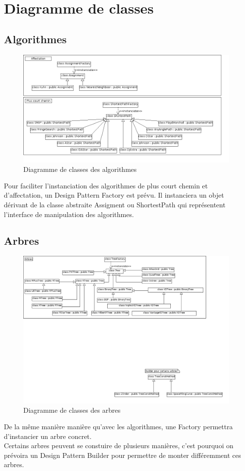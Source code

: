 \section{Diagramme de classes}
\subsection{Algorithmes}
\begin{figure}[!h]\centering
   \includegraphics[scale=0.5]{images/c_algo.png}
   \caption{\label{c_algo} Diagramme de classes des algorithmes}
\end{figure}
Pour faciliter l'instanciation des algorithmes de plus court chemin et d'affectation, un Design Pattern Factory est prévu. Il instanciera un objet dérivant de la classe abstraite Assigment ou ShortestPath qui représentent l'interface de manipulation des algorithmes.

\subsection{Arbres}
\begin{figure}[!h]\centering
   \includegraphics[scale=0.5]{images/c_arbres.png}
   \caption{\label{c_arbre} Diagramme de classes des arbres}
\end{figure}
De la même manière manière qu'avec les algorithmes, une Factory permettra d'instancier un arbre concret.\\
Certains arbres peuvent se constuire de plusieurs manières, c'est pourquoi on prévoira un Design Pattern Builder pour permettre de monter différemment ces arbres.

